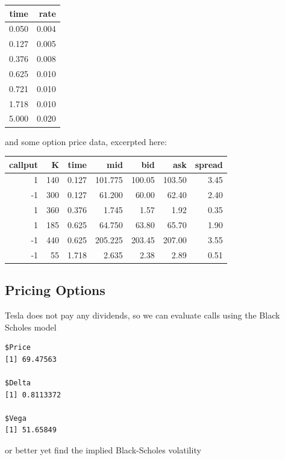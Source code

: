 \documentclass[]{article}
\newenvironment{Shaded}{\begin{snugshade}}{\end{snugshade}}
\newcommand{\DataTypeTok}[1]{\textcolor[rgb]{0.13,0.29,0.53}{#1}}
\newcommand{\DecValTok}[1]{\textcolor[rgb]{0.00,0.00,0.81}{#1}}
\newcommand{\FloatTok}[1]{\textcolor[rgb]{0.00,0.00,0.81}{#1}}
\newcommand{\KeywordTok}[1]{\textcolor[rgb]{0.13,0.29,0.53}{\textbf{#1}}}
\newcommand{\NormalTok}[1]{#1}
\newcommand{\OperatorTok}[1]{\textcolor[rgb]{0.81,0.36,0.00}{\textbf{#1}}}
\newcommand{\StringTok}[1]{\textcolor[rgb]{0.31,0.60,0.02}{#1}}
\begin{document}
\begin{longtable}[]{@{}rr@{}}
\toprule
time & rate\tabularnewline
\midrule
\endhead
0.050 & 0.004\tabularnewline
0.127 & 0.005\tabularnewline
0.376 & 0.008\tabularnewline
0.625 & 0.010\tabularnewline
0.721 & 0.010\tabularnewline
1.718 & 0.010\tabularnewline
5.000 & 0.020\tabularnewline
\bottomrule
\end{longtable}

and some option price data, excerpted here:

\begin{longtable}[]{@{}rrrrrrr@{}}
\toprule
callput & K & time & mid & bid & ask & spread\tabularnewline
\midrule
\endhead
1 & 140 & 0.127 & 101.775 & 100.05 & 103.50 & 3.45\tabularnewline
-1 & 300 & 0.127 & 61.200 & 60.00 & 62.40 & 2.40\tabularnewline
1 & 360 & 0.376 & 1.745 & 1.57 & 1.92 & 0.35\tabularnewline
1 & 185 & 0.625 & 64.750 & 63.80 & 65.70 & 1.90\tabularnewline
-1 & 440 & 0.625 & 205.225 & 203.45 & 207.00 & 3.55\tabularnewline
-1 & 55 & 1.718 & 2.635 & 2.38 & 2.89 & 0.51\tabularnewline
\bottomrule
\end{longtable}

\hypertarget{pricing-options}{%
\subsection{Pricing Options}\label{pricing-options}}

Tesla does not pay any dividends, so we can evaluate calls using the
Black Scholes model

\begin{verbatim}
$Price
[1] 69.47563

$Delta
[1] 0.8113372

$Vega
[1] 51.65849
\end{verbatim}

or better yet find the implied Black-Scholes volatility

\begin{Shaded}
\end{Shaded}
\end{document}
